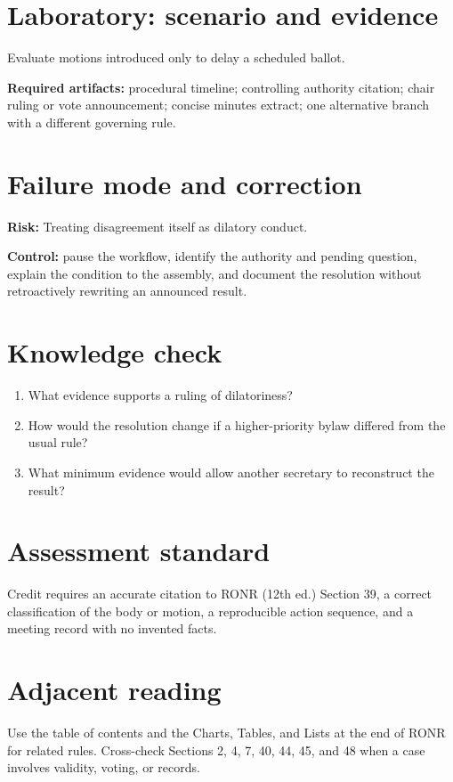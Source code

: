 \documentclass[11pt]{article}
\begin{document}
\section{Laboratory: scenario and evidence}
Evaluate motions introduced only to delay a scheduled ballot.

\textbf{Required artifacts:} procedural timeline; controlling authority citation; chair ruling or vote announcement; concise minutes extract; one alternative branch with a different governing rule.

\section{Failure mode and correction}
\textbf{Risk:} Treating disagreement itself as dilatory conduct.

\textbf{Control:} pause the workflow, identify the authority and pending question, explain the condition to the assembly, and document the resolution without retroactively rewriting an announced result.

\section{Knowledge check}
\begin{enumerate}[leftmargin=*,itemsep=4pt]
\item What evidence supports a ruling of dilatoriness?
\item How would the resolution change if a higher-priority bylaw differed from the usual rule?
\item What minimum evidence would allow another secretary to reconstruct the result?
\end{enumerate}

\section{Assessment standard}
Credit requires an accurate citation to RONR (12th ed.) Section 39, a correct classification of the body or motion, a reproducible action sequence, and a meeting record with no invented facts.

\section{Adjacent reading}
Use the table of contents and the Charts, Tables, and Lists at the end of RONR for related rules. Cross-check Sections 2, 4, 7, 40, 44, 45, and 48 when a case involves validity, voting, or records.
\end{document}
